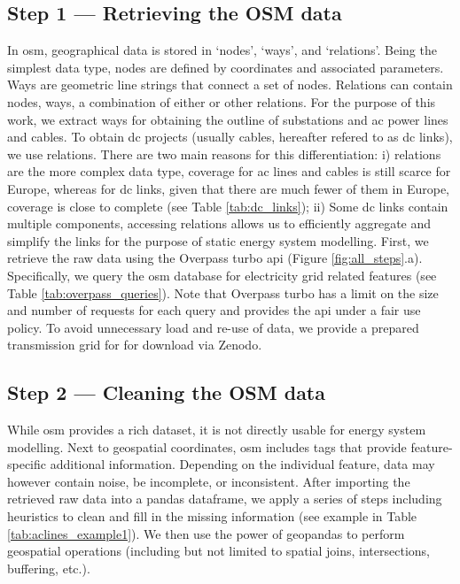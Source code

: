 \documentclass[fleqn,10pt]{wlscirep}
\let\autocite\cite
\begin{document}
\subsection*{Step 1 --- Retrieving the OSM data}
In \gls{osm}, geographical data is stored in `nodes', `ways', and `relations'. Being the simplest data type, nodes are defined by coordinates and associated parameters. Ways are geometric line strings that connect a set of nodes. Relations can contain nodes, ways, a combination of either or other relations. \autocite{medjroubiOpenDataPower2017} For the purpose of this work, we extract ways for obtaining the outline of substations and \acrshort{ac} power lines and cables. To obtain \acrshort{dc} projects (usually cables, hereafter refered to as \acrshort{dc} links), we use relations. There are two main reasons for this differentiation: i) relations are the more complex data type, coverage for \acrshort{ac} lines and cables is still scarce for Europe, whereas for \acrshort{dc} links, given that there are much fewer of them in Europe, coverage is close to complete (see Table \ref{tab:dc_links}); ii) Some \acrshort{dc} links contain multiple components, accessing relations allows us to efficiently aggregate and simplify the links for the purpose of static energy system modelling.
First, we retrieve the raw data using the Overpass turbo \gls{api}\autocite{raiferOverpassTurbo2024} (Figure \ref{fig:all_steps}.a). Specifically, we query the \gls{osm} database for electricity grid related features (see Table \ref{tab:overpass_queries}). Note that Overpass turbo has a limit on the size and number of requests for each query and provides the \gls{api} under a fair use policy. To avoid unnecessary load and re-use of data, we provide a prepared transmission grid for for download via Zenodo. \autocite{xiongPrebuiltElectricityNetwork2024}

\subsection*{Step 2 --- Cleaning the OSM data}
While \gls{osm} provides a rich dataset, it is not directly usable for energy system modelling. Next to geospatial coordinates, \gls{osm} includes tags that provide feature-specific additional information. Depending on the individual feature, data may however contain noise, be incomplete, or inconsistent. After importing the retrieved raw data into a pandas dataframe,\autocite{mckinneyDataStructuresStatistical2010} we apply a series of steps including heuristics to clean and fill in the missing information (see example in Table \ref{tab:aclines_example1}). We then use the power of geopandas\autocite{jordahlGeopandasGeopandasV02020} to perform geospatial operations (including but not limited to spatial joins, intersections, buffering, etc.).
\end{document}
